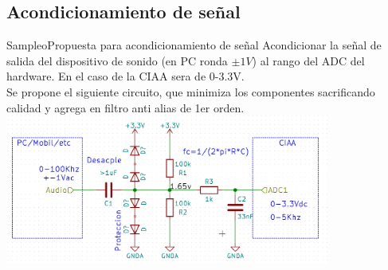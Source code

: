\subsection{Acondicionamiento de señal}
\begin{frame}{Sampleo}{Propuesta para acondicionamiento de señal}
   Acondicionar la señal de salida del dispositivo de sonido (en PC ronda $\pm1V$) al rango del ADC del hardware. En el caso de la CIAA sera de 0-3.3V. \\ Se propone el siguiente circuito, que minimiza los componentes sacrificando calidad y agrega en filtro anti alias de 1er orden.
   \protoboardicon
   \center\includegraphics[width=0.8\textwidth]{1_clase/circuito}
   \vfill
\end{frame}
